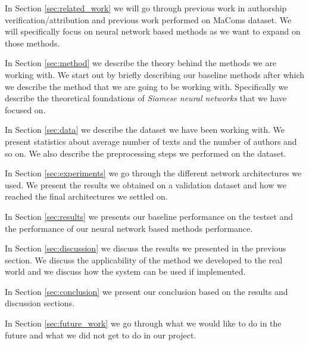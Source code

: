 In Section \ref{sec:related_work} we will go through previous work in authorship
verification/attribution and previous work performed on MaComs dataset. We will
specifically focus on neural network based methods as we want to expand on those
methods.

In Section \ref{sec:method} we describe the theory behind the methods we are
working with. We start out by briefly describing our baseline methods after
which we describe the method that we are going to be working with. Specifically
we describe the theoretical foundations of \textit{Siamese neural networks} that
we have focused on.

In Section \ref{sec:data} we describe the dataset we have been working with. We
present statistics about average number of texts and the number of authors and
so on. We also describe the preprocessing steps we performed on the dataset.

In Section \ref{sec:experiments} we go through the different network
architectures we used. We present the results we obtained on a validation
dataset and how we reached the final architectures we settled on.

In Section \ref{sec:results} we presents our baseline performance on the testset
and the performance of our neural network based methods performance.

In Section \ref{sec:discussion} we discuss the results we presented in the
previous section. We discuss the applicability of the method we developed to the
real world and we discuss how the system can be used if implemented.

In Section \ref{sec:conclusion} we present our conclusion based on the results
and discussion sections.

In Section \ref{sec:future_work} we go through what we would like to do in the
future and what we did not get to do in our project.
